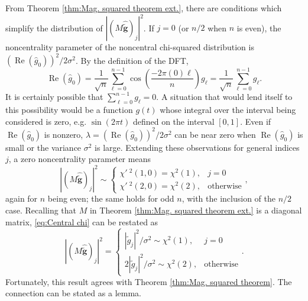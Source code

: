 \documentclass[12pt,notitlepage]{report}
\newcommand{\gnoiseVec}{\widetilde{\mathbf{g}}}	%
\newcommand{\noiseSD}{\sigma}	%
\renewcommand{\Re}{\operatorname{Re}}	%
\newcommand{\NCchi}{\chi'\:}	%
\begin{document}
From Theorem \ref{thm:Mag. squared theorem ext.}, there are conditions which simplify the distribution of $|(M\widehat{\gnoiseVec})_j|^2$. If $j = 0$ (or $n/2$ when $n$ is even), the noncentrality parameter of the noncentral chi-squared distribution is $(\Re(\widehat{g}_0))^2/2\noiseSD^2$. By the definition of the DFT,
\[\Re(\widehat{g}_0) = \frac{1}{\sqrt{n}}\sum_{\ell=0}^{n-1} \cos\left(\frac{-2\pi(0)\ell}{n}\right)g_\ell = \frac{1}{\sqrt{n}}\sum_{\ell=0}^{n-1} g_\ell.\]
It is certainly possible that $\sum_{\ell=0}^{n-1} g_\ell = 0$. A situation that would lend itself to this possibility would be a function $g(t)$ whose integral over the interval being considered is zero, e.g. $\sin(2\pi{t})$ defined on the interval $[0,1]$. Even if $\Re(\widehat{g}_0)$ is nonzero, $\lambda = (\Re(\widehat{g}_0))^2/2\noiseSD^2$ can be near zero when $\Re(\widehat{g}_0)$ is small or the variance $\noiseSD^2$ is large. Extending these observations for general indices $j$, a zero noncentrality parameter means
\begin{equation}
\label{eq:Central chi}
|(M\widehat{\gnoiseVec})_j|^2 \sim \begin{cases}
\NCchi^2\left(1,0\right) = \chi^2(1), & j = 0 \\
\NCchi^2\left(2,0\right) = \chi^2(2), & \text{otherwise} \end{cases},
\end{equation}
again for $n$ being even; the same holds for odd $n$, with the inclusion of the $n/2$ case.  Recalling that $M$ in Theorem \ref{thm:Mag. squared theorem ext.} is a diagonal matrix, \eqref{eq:Central chi} can be restated as
\[|(M\widehat{\gnoiseVec})_j|^2 = \begin{cases}
|\widehat{\tilde{g}}_j|^2/\noiseSD^2 \sim \chi^2(1), & j = 0 \\
2|\widehat{\tilde{g}}_j|^2/\noiseSD^2 \sim \chi^2(2), & \text{otherwise} \end{cases}.\]
Fortunately, this result agrees with Theorem \ref{thm:Mag. squared theorem}. The connection can be stated as a lemma.
\end{document}
